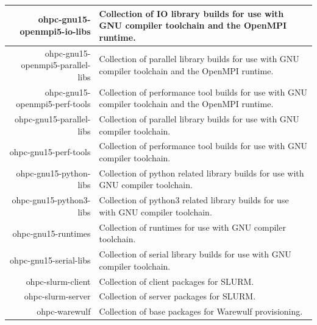 \begin{tabularx}{\textwidth}{r|X}
\hline
ohpc-gnu15-openmpi5-io-libs & Collection of IO library builds for use with GNU compiler toolchain and the OpenMPI runtime. \\
\hline
ohpc-gnu15-openmpi5-parallel-libs & Collection of parallel library builds for use with GNU compiler toolchain and the OpenMPI runtime. \\
\hline
ohpc-gnu15-openmpi5-perf-tools & Collection of performance tool builds for use with GNU compiler toolchain and the OpenMPI runtime. \\
\hline
ohpc-gnu15-parallel-libs & Collection of parallel library builds for use with GNU compiler toolchain. \\
\hline
ohpc-gnu15-perf-tools & Collection of performance tool builds for use with GNU compiler toolchain. \\
\hline
ohpc-gnu15-python-libs & Collection of python related library builds for use with GNU compiler toolchain. \\
\hline
ohpc-gnu15-python3-libs & Collection of python3 related library builds for use with GNU compiler toolchain. \\
\hline
ohpc-gnu15-runtimes & Collection of runtimes for use with GNU compiler toolchain. \\
\hline
ohpc-gnu15-serial-libs & Collection of serial library builds for use with GNU compiler toolchain. \\
\hline
ohpc-slurm-client & Collection of client packages for SLURM. \\
\hline
ohpc-slurm-server & Collection of server packages for SLURM. \\
\hline
ohpc-warewulf & Collection of base packages for Warewulf provisioning. \\
\hline
\bottomrule
\end{tabularx}
